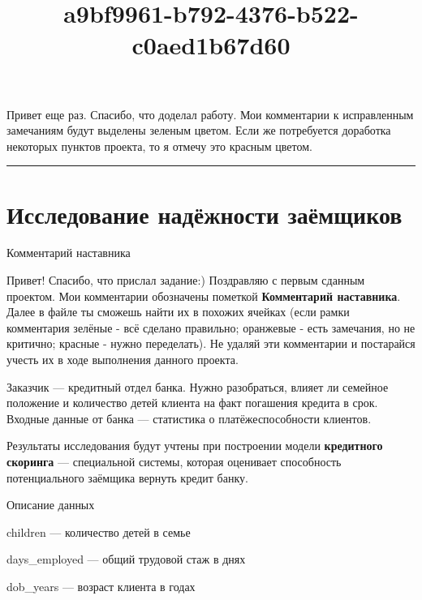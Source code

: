\documentclass[11pt]{article}
\title{a9bf9961-b792-4376-b522-c0aed1b67d60}
\begin{document}
    
    
    \maketitle
    
    

    
    Привет еще раз. Спасибо, что доделал работу. Мои комментарии к
исправленным замечаниям будут выделены зеленым цветом. Если же
потребуется доработка некоторых пунктов проекта, то я отмечу это красным
цветом.

\begin{center}\rule{0.5\linewidth}{0.5pt}\end{center}

    \hypertarget{ux438ux441ux441ux43bux435ux434ux43eux432ux430ux43dux438ux435-ux43dux430ux434ux451ux436ux43dux43eux441ux442ux438-ux437ux430ux451ux43cux449ux438ux43aux43eux432}{%
\section{Исследование надёжности
заёмщиков}\label{ux438ux441ux441ux43bux435ux434ux43eux432ux430ux43dux438ux435-ux43dux430ux434ux451ux436ux43dux43eux441ux442ux438-ux437ux430ux451ux43cux449ux438ux43aux43eux432}}

    Комментарий наставника

Привет! Спасибо, что прислал задание:) Поздравляю с первым сданным
проектом. Мои комментарии обозначены пометкой \textbf{Комментарий
наставника}. Далее в файле ты сможешь найти их в похожих ячейках (если
рамки комментария зелёные - всё сделано правильно; оранжевые - есть
замечания, но не критично; красные - нужно переделать). Не удаляй эти
комментарии и постарайся учесть их в ходе выполнения данного проекта.

    Заказчик --- кредитный отдел банка. Нужно разобраться, влияет ли
семейное положение и количество детей клиента на факт погашения кредита
в срок. Входные данные от банка --- статистика о платёжеспособности
клиентов.

Результаты исследования будут учтены при построении модели
\textbf{кредитного скоринга} --- специальной системы, которая оценивает
способность потенциального заёмщика вернуть кредит банку.

Описание данных

children --- количество детей в семье

days\_employed --- общий трудовой стаж в днях

dob\_years --- возраст клиента в годах
\end{document}
